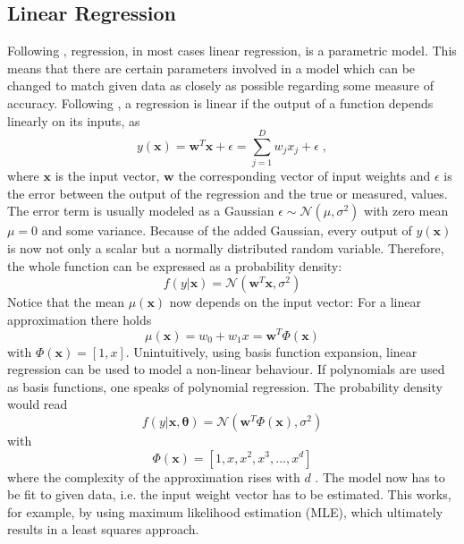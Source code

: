 \documentclass[%
  a4paper,oneside,%
  11pt,%
  smallchapters,
  style=printdev,
  extramargin,
  green,%
  rgb, <cmyk>
  ]{tubsbook}
\begin{document}
\subsection{Linear Regression}
Following \cite{murphy2012}, regression, in most cases linear regression, is a parametric model. This means that there are certain parameters involved in a model which can be changed to match given data as closely as possible regarding some measure of accuracy. Following \cite[p. 19]{murphy2012}, a regression is linear if the output of a function depends linearly on its inputs, as 
%
\begin{equation}
y(\bm{x}) = \bm{w}^T \bm{x} + \epsilon = \sum_{j = 1}^D w_jx_j + \epsilon \;,
\label{eqn:linReg}
\end{equation}
%
where $\bm{x}$ is the input vector, $\bm{w}$ the corresponding vector of input weights and $\epsilon$ is the error between the output of the regression and the true or measured, values. The error term is usually modeled as a Gaussian $\epsilon \sim \mathcal{N}(\mu,\sigma^2)$ with zero mean $\mu = 0$ and some variance. Because of the added Gaussian, every output of $y(\bm{x})$ is now not only a scalar but a normally distributed random variable. Therefore, the whole function can be expressed as a probability density:
%
\begin{equation}
f(y|\bm{x}) = \mathcal{N}(\bm{w}^T\bm{x},\sigma^2)
\end{equation}
%
Notice that the mean $\mu(\bm{x})$ now depends on the input vector: For a linear approximation there holds
\begin{equation}
\mu (\bm{x}) = w_0 + w_1x= \bm{w}^T\Phi(\bm{x}) 
\end{equation}
with $\Phi(\bm{x}) = [1,x]$. 
Unintuitively, using basis function expansion, linear regression can be used to model a non-linear behaviour. If polynomials are used as basis functions, one speaks of polynomial regression. The probability density would read
\begin{equation}
f(y|\bm{x},\bm{\theta}) = \mathcal{N}(\bm{w}^T\Phi(\bm{x}),\sigma^2)
\end{equation}
with 
\begin{equation}
\Phi(\bm{x}) = [1,x,x^2,x^3,...,x^d]
\end{equation}
where the complexity of the approximation rises with $d$ \cite[p. 20]{murphy2012}. 
The model now has to be fit to given data, i.e. the input weight vector has to be estimated. This works, for example, by using maximum likelihood estimation (MLE), which ultimately results in a least squares approach.
\end{document}
